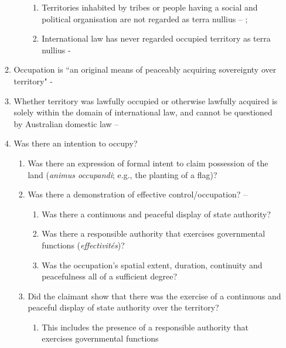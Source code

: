 \begin{enumerate}
\begin{enumerate}
\begin{enumerate}
\begin{enumerate}
                \item Territories inhabited by tribes or people having a social and political organisation are not regarded as terra nullius -- ; 
                \item International law has never regarded occupied territory as terra nullius - 
            \end{enumerate}
        \end{enumerate}
        \item Occupation is ``an original means of peaceably acquiring sovereignty over territory" - 
        \item Whether territory was lawfully occupied or otherwise lawfully acquired is solely within the domain of international law, and cannot be questioned by Australian domestic law -- 
        \item Was there an intention to occupy?
        \begin{enumerate}
            \item Was there an expression of formal intent to claim possession of the land (\textit{animus occupandi}; e.g., the planting of a flag)?
            \item Was there a demonstration of effective control/occupation? -- 
            \begin{enumerate}
                \item Was there a continuous and peaceful display of state authority?
                \item Was there a responsible authority that exercises governmental functions (\textit{effectivités})?
                \item Was the occupation's spatial extent, duration, continuity and peacefulness all of a sufficient degree?
            \end{enumerate}
            \item Did the claimant show that there was the exercise of a continuous and peaceful display of state authority over the territory?
            \begin{enumerate}
                \item This includes the presence of a responsible authority that exercises governmental functions

\end{enumerate}
\end{enumerate}
\end{enumerate}
\end{enumerate}
